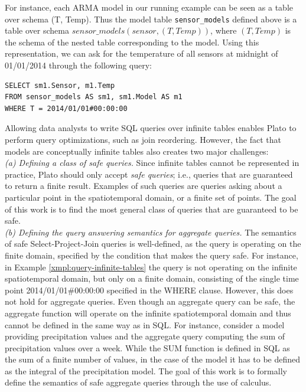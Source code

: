 \vspace*{0.5cm}
\begin{example}
\label{xmpl:query-infinite-tables}
For instance, each ARMA model in our running example can be seen as a table over schema (T, Temp). Thus the model table \texttt{sensor\_models} defined above is a table over schema $sensor\_models(sensor, (T, Temp))$, where $(T, Temp)$ is the schema of the nested table corresponding to the model. Using this representation, we can ask for the temperature of all sensors at midnight of 01/01/2014 through the following query:

\begin{verbatim}
SELECT sm1.Sensor, m1.Temp
FROM sensor_models AS sm1, sm1.Model AS m1
WHERE T = 2014/01/01#00:00:00
\end{verbatim}
\end{example}
\vspace*{0.5cm}

Allowing data analysts to write SQL queries over infinite tables enables Plato to perform query optimizations, such as join reordering. However, the fact that models are conceptually infinite tables also creates two major challenges:\\

\emph{(a) Defining a class of safe queries.} Since infinite tables cannot be represented in practice, Plato should only accept {\em safe queries}; i.e., queries that are guaranteed to return a finite result. Examples of such queries are queries asking about a particular point in the spatiotemporal domain, or a finite set of points. The goal of this work is to find the most general class of queries that are guaranteed to be safe.\\

\emph{(b) Defining the query answering semantics for aggregate queries.} The semantics of safe Select-Project-Join queries is well-defined, as the query is operating on the finite domain, specified by the condition that makes the query safe. For instance, in Example \ref{xmpl:query-infinite-tables} the query is not operating on the infinite spatiotemporal domain, but only on a finite domain, consisting of the single time point 2014/01/01\#00:00:00 specified in the WHERE clause.  However, this does not hold for aggregate queries. Even though an aggregate query can be safe, the aggregate function will operate on the infinite spatiotemporal domain and thus cannot be defined in the same way as in SQL. For instance, consider a model providing precipitation values and the aggregate query computing the sum of precipitation values over a week. While the SUM function is defined in SQL as the sum of a finite number of values, in the case of the model it has to be defined as the integral of the precipitation model. The goal of this work is to formally define the semantics of safe aggregate queries through the use of calculus. 


